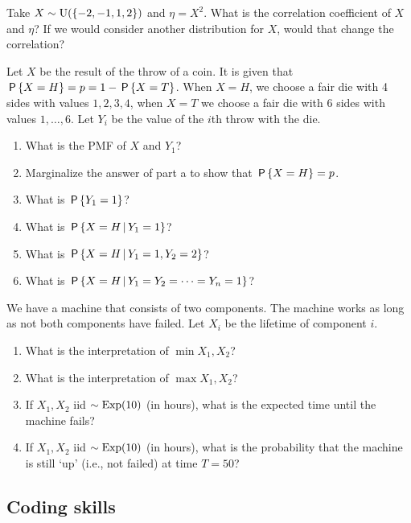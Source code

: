\documentclass[assignments]{subfiles}
\begin{document}
\begin{exercise}
Take $X\sim\Unif{\{-2, -1, 1, 2\}}$ and $\eta = X^2$. What is the correlation coefficient of $X$ and $\eta$? 
If we would consider another distribution for $X$, would that change the correlation?
\end{exercise}


\begin{exercise}
Let $X$ be the result of the throw of a coin.
It is given that $\P{X=H} = p = 1-\P{X=T}$.
When $X=H$, we choose a fair die with 4 sides with values $1,2,3,4$, when $X=T$ we choose a fair die with 6 sides with values $1,\ldots,6$.
Let $Y_i$ be the value of the $i$th throw with the die.
\begin{enumerate}
\item What is the PMF of $X$ and $Y_1$?
\item Marginalize  the answer of part a to show that $\P{X=H} = p$. 
\item What is $\P{Y_{1}=1}$?
\item What is $\P{X=H \given Y_1=1}$?
\item What is $\P{X=H \given Y_1=1, Y_2=2}$?
\item What is $\P{X=H \given Y_1=Y_2=\cdots=Y_n = 1}$?
\end{enumerate}
\end{exercise}


\begin{exercise}
We have a machine that consists of two components. The machine works as long as not both components have failed. Let $X_i$ be the lifetime of component $i$. 
\begin{enumerate}
\item What is the interpretation of $\min{X_1, X_{2}}$?
\item What is the interpretation of $\max{X_1, X_{2}}$?
\item If $X_1, X_2$ iid $\sim \Exp{10}$ (in hours), what is the expected time until the machine fails? 
\item If $X_1, X_2$ iid $\sim \Exp{10}$ (in hours), what is the probability that the machine is still `up' (i.e., not failed) at time $T=50$? 
\end{enumerate}
\end{exercise}


\subsection{Coding skills}
\label{sec:progr-assignm}
\end{document}
